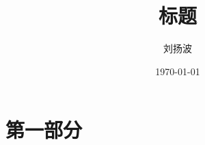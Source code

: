 \documentclass[17pt]{beamer}	%
\begin{document}
\title{标题}
\author{刘扬波}
\date{\today}
\begin{frame}
\titlepage
\end{frame}

\begin{frame}
\tableofcontents[hideallsubsections]
\end{frame}

\section{第一部分}
\end{document}
